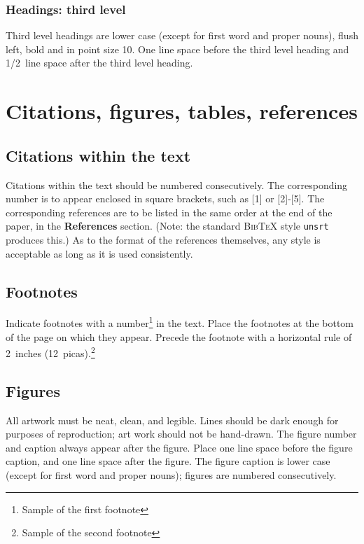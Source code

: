 \documentclass{article} %
\begin{document}
\subsubsection{Headings: third level}

Third level headings are lower case (except for first word and proper nouns),
flush left, bold and in point size 10. One line space before the third level
heading and 1/2~line space after the third level heading.

\section{Citations, figures, tables, references}
\label{others}


\subsection{Citations within the text}

Citations within the text should be numbered consecutively. The corresponding
number is to appear enclosed in square brackets, such as [1] or [2]-[5]. The
corresponding references are to be listed in the same order at the end of the
paper, in the \textbf{References} section. (Note: the standard
\textsc{Bib\TeX} style \texttt{unsrt} produces this.) As to the format of the
references themselves, any style is acceptable as long as it is used
consistently.


\subsection{Footnotes}

Indicate footnotes with a number\footnote{Sample of the first footnote} in the
text. Place the footnotes at the bottom of the page on which they appear.
Precede the footnote with a horizontal rule of 2~inches
(12~picas).\footnote{Sample of the second footnote}

\subsection{Figures}

All artwork must be neat, clean, and legible. Lines should be dark
enough for purposes of reproduction; art work should not be
hand-drawn. The figure number and caption always appear after the
figure. Place one line space before the figure caption, and one line
space after the figure. The figure caption is lower case (except for
first word and proper nouns); figures are numbered consecutively.
\end{document}
